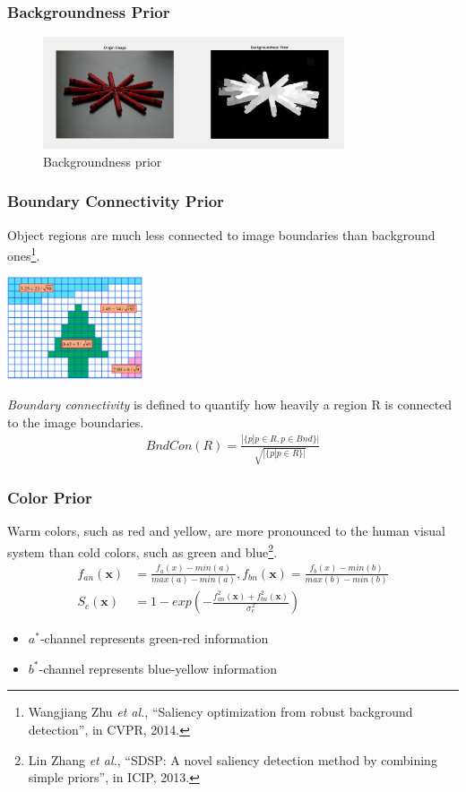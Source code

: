 \documentclass[notheorems,serif,table,compress]{beamer}  %
\begin{document}
\begin{frame}
\frametitle{Backgroundness Prior}
\begin{figure}
  \centering
\includegraphics[width=3.5in]{backgroundness.png}
  \caption{Backgroundness prior}
 \label{center prior}
  \end{figure}
\end{frame}

\begin{frame}
\frametitle{ Boundary Connectivity Prior}
{\color{blue}Object regions are much less connected to image boundaries than background ones}\footnote{Wangjiang Zhu \textit{et al.}, ``Saliency optimization from robust background detection'', in CVPR, 2014.}{\color{blue}.}

\centering\includegraphics[width=4cm]{wCtr.png}

\emph{Boundary connectivity} is defined to quantify how heavily a region R is connected to the image boundaries.
\begin{align}
BndCon(R) = \frac{|\{p|p\in R, p\in Bnd\}|}{\sqrt{|\{p|p\in R\}|}}
\end{align}
\end{frame}


\begin{frame}
\frametitle{ Color Prior}
{\color{blue}Warm colors, such as red and yellow, are more pronounced to the human visual system than cold colors, such as green and blue}\footnote{Lin Zhang \textit{et al.}, ``SDSP: A novel saliency detection method by combining simple priors'', in ICIP, 2013.}{\color{blue}.}
\begin{align}
f_{an}(\textbf{x}) & =\frac{f_a(x)-min(a)}{max(a)-min(a)}, f_{bn}(\textbf{x}) = \frac{f_b(x)-min(b)}{max(b)-min(b)}\\
S_c(\textbf{x}) & = 1-exp\left(-\frac{f_{an}^2(\textbf{x})+f_{bn}^2(\textbf{x})}{\sigma_c^2}\right)
\end{align}
\begin{itemize}
\item $a^*$-channel represents green-red information
\item $b^*$-channel represents blue-yellow information
\end{itemize}
\end{frame}
\end{document}
